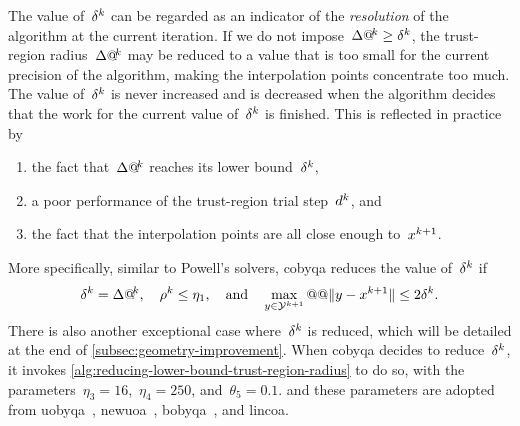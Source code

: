 The value of~$\radlb[k]$ can be regarded as an indicator of the \emph{resolution} of the algorithm at the current iteration.
If we do not impose~$\rad[k] \ge \radlb[k]$, the trust-region radius~$\rad[k]$ may be reduced to a value that is too small for the current precision of the algorithm, making the interpolation points concentrate too much.
The value of~$\radlb[k]$ is never increased and is decreased when the algorithm decides that the work for the current value of~$\radlb[k]$ is finished.
This is reflected in practice by
\begin{enumerate}
    \item the fact that~$\rad[k]$ reaches its lower bound~$\radlb[k]$,
    \item a poor performance of the trust-region trial step~$\step[k]$, and
    \item the fact that the interpolation points are all close enough to~$\iter[k + 1]$.
\end{enumerate}
More specifically, similar to Powell's solvers, \gls{cobyqa} reduces the value of~$\radlb[k]$ if
\begin{equation*}
    \radlb[k] = \rad[k], \quad \ratio[k] \le \eta_1, \quad \text{and} \quad \max_{y \in \xpt[k + 1]} @@ \norm{y  - \iter[k + 1]} \le 2 \radlb[k].
\end{equation*}
There is also another exceptional case where~$\radlb[k]$ is reduced, which will be detailed at the end of \cref{subsec:geometry-improvement}.
When \gls{cobyqa} decides to reduce~$\radlb[k]$, it invokes \cref{alg:reducing-lower-bound-trust-region-radius} to do so, with the parameters~$\eta_3 = 16$,~$\eta_4 = 250$, and~$\theta_5 = 0.1$.
 and these parameters are adopted from \gls{uobyqa}~\cite{Powell_2002}, \gls{newuoa}~\cite{Powell_2006}, \gls{bobyqa}~\cite{Powell_2009}, and \gls{lincoa}.

